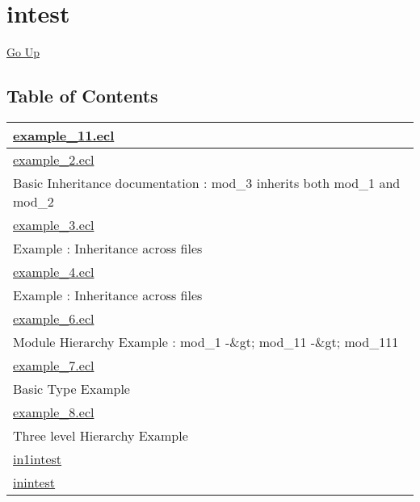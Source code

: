 \chapter*{\color{headtoc} intest}
\hypertarget{ecldoc:toc:root/intest}{}
\hyperlink{ecldoc:toc:root}{Go Up}


\section*{Table of Contents}
{\renewcommand{\arraystretch}{1.5}
\begin{longtable}{|p{\textwidth}|}
\hline
\hyperlink{ecldoc:toc:intest.example_11}{example\_11.ecl} \\
\hline
\hyperlink{ecldoc:toc:intest.example_2}{example\_2.ecl} \\
Basic Inheritance documentation : mod\_3 inherits both mod\_1 and mod\_2 \\
\hline
\hyperlink{ecldoc:toc:intest.example_3}{example\_3.ecl} \\
Example : Inheritance across files \\
\hline
\hyperlink{ecldoc:toc:intest.example_4}{example\_4.ecl} \\
Example : Inheritance across files \\
\hline
\hyperlink{ecldoc:toc:intest.example_6}{example\_6.ecl} \\
Module Hierarchy Example : mod\_1 -\&gt; mod\_11 -\&gt; mod\_111 \\
\hline
\hyperlink{ecldoc:toc:intest.example_7}{example\_7.ecl} \\
Basic Type Example \\
\hline
\hyperlink{ecldoc:toc:intest.example_8}{example\_8.ecl} \\
Three level Hierarchy Example \\
\hline
\hyperlink{ecldoc:toc:root/intest/in1intest}{in1intest} \\
\hline
\hyperlink{ecldoc:toc:root/intest/inintest}{inintest} \\
\hline
\end{longtable}
}










